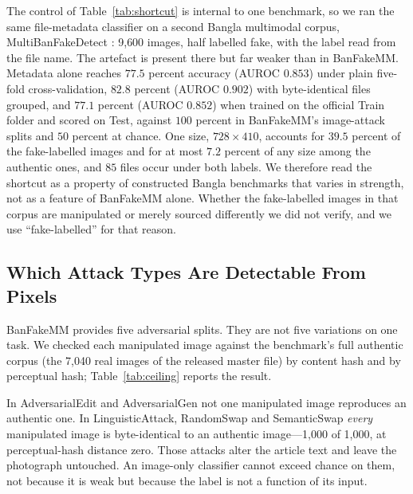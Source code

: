The control of Table~\ref{tab:shortcut} is internal to one benchmark, so we ran
the same file-metadata classifier on a second Bangla multimodal corpus,
MultiBanFakeDetect \cite{multibanfake}: 9{,}600 images, half labelled fake,
with the label read from the file name. The artefact is present there but far
weaker than in BanFakeMM. Metadata alone reaches $77.5$ percent accuracy
(AUROC $0.853$) under plain five-fold cross-validation, $82.8$ percent
(AUROC $0.902$) with byte-identical files grouped, and $77.1$ percent
(AUROC $0.852$) when trained on the official Train folder and scored on Test,
against $100$ percent in BanFakeMM's image-attack splits and $50$ percent at
chance. One size, $728\times410$, accounts for $39.5$ percent of the
fake-labelled images and for at most $7.2$ percent of any size among the
authentic ones, and $85$ files occur under both labels. We therefore read the
shortcut as a property of constructed Bangla benchmarks that varies in
strength, not as a feature of BanFakeMM alone. Whether the fake-labelled images
in that corpus are manipulated or merely sourced differently we did not
verify, and we use ``fake-labelled'' for that reason.

\subsection{Which Attack Types Are Detectable From Pixels}
\label{sec:detectable}

BanFakeMM provides five adversarial splits. They are not five variations on
one task. We checked each manipulated image against the benchmark's full
authentic corpus (the 7{,}040 real images of the released master file) by
content hash and by perceptual hash; Table~\ref{tab:ceiling} reports the
result.

In AdversarialEdit and AdversarialGen not one manipulated image reproduces an
authentic one. In LinguisticAttack, RandomSwap and SemanticSwap \emph{every}
manipulated image is byte-identical to an authentic image---1{,}000 of 1{,}000,
at perceptual-hash distance zero. Those attacks alter the article text and
leave the photograph untouched. An image-only classifier cannot exceed chance
on them, not because it is weak but because the label is not a function of its
input.

